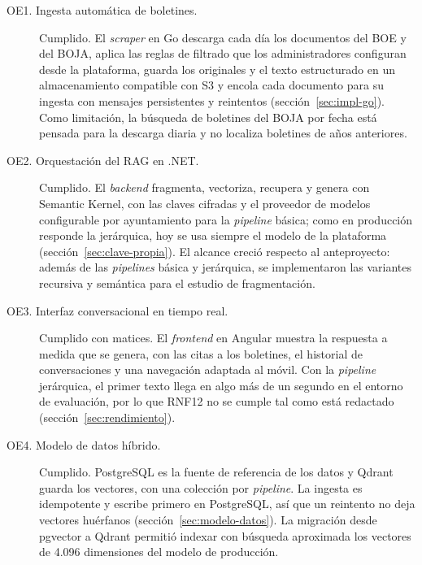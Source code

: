 \begin{description}
  \item[OE1. Ingesta automática de boletines.] Cumplido. El \emph{scraper} en Go descarga cada día los documentos del BOE y del BOJA, aplica las reglas de filtrado que los administradores configuran desde la plataforma, guarda los originales y el texto estructurado en un almacenamiento compatible con S3 y encola cada documento para su ingesta con mensajes persistentes y reintentos (sección~\ref{sec:impl-go}). Como limitación, la búsqueda de boletines del BOJA por fecha está pensada para la descarga diaria y no localiza boletines de años anteriores.

  \item[OE2. Orquestación del RAG en .NET.] Cumplido. El \emph{backend} fragmenta, vectoriza, recupera y genera con Semantic Kernel, con las claves cifradas y el proveedor de modelos configurable por ayuntamiento para la \emph{pipeline} básica; como en producción responde la jerárquica, hoy se usa siempre el modelo de la plataforma (sección~\ref{sec:clave-propia}). El alcance creció respecto al anteproyecto: además de las \emph{pipelines} básica y jerárquica, se implementaron las variantes recursiva y semántica para el estudio de fragmentación.

  \item[OE3. Interfaz conversacional en tiempo real.] Cumplido con matices. El \emph{frontend} en Angular muestra la respuesta a medida que se genera, con las citas a los boletines, el historial de conversaciones y una navegación adaptada al móvil. Con la \emph{pipeline} jerárquica, el primer texto llega en algo más de un segundo en el entorno de evaluación, por lo que RNF12 no se cumple tal como está redactado (sección~\ref{sec:rendimiento}).

  \item[OE4. Modelo de datos híbrido.] Cumplido. PostgreSQL es la fuente de referencia de los datos y Qdrant guarda los vectores, con una colección por \emph{pipeline}. La ingesta es idempotente y escribe primero en PostgreSQL, así que un reintento no deja vectores huérfanos (sección~\ref{sec:modelo-datos}). La migración desde pgvector a Qdrant permitió indexar con búsqueda aproximada los vectores de 4.096 dimensiones del modelo de producción.


\end{description}
